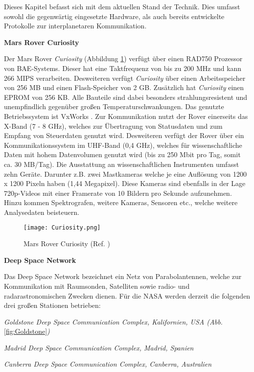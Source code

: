 \label{cap:standDerTechnik}
Dieses Kapitel befasst sich mit dem aktuellen Stand der Technik. Dies
umfasst sowohl die gegenw{\"a}rtig eingesetzte Hardware, als auch bereits
entwickelte Protokolle zur interplanetaren Kommunikation.


\textbf{Mars Rover Curiosity} 

Der Mars Rover \textit{Curiosity} (Abbildung \ref{fig:Curiosity}) verf{\"u}gt
{\"u}ber einen RAD750 Prozessor von BAE-Systems.
Dieser hat eine Taktfrequenz von bis zu 200 MHz und kann 266 MIPS
verarbeiten. Desweiteren verf{\"u}gt \textit{Curiosity} {\"u}ber einen
Arbeitsspeicher von 256 MB und einen Flash-Speicher von 2 GB. Zus{\"a}tzlich hat
\textit{Curiosity} einen EPROM von 256 KB. Alle Bauteile sind dabei besonders
strahlungsresistent und unempfindlich gegen{\"u}ber gro{\ss}en
Temperaturschwankungen. Das genutzte Betriebssystem ist VxWorks .
Zur Kommunikation nutzt der Rover einerseits das X-Band (7 - 8 GHz), welches zur
{\"U}bertragung von Statusdaten und zum Empfang von Steuerdaten genutzt wird.
Desweiteren verf{\"u}gt der Rover {\"u}ber ein Kommunikationssystem im UHF-Band
(0,4 GHz), welches f{\"u}r wissenschaftliche Daten mit hohem Datenvolumen
genutzt wird (bis zu 250 Mbit pro Tag, somit ca. 30 MB/Tag). Die Ausstattung an
wissenschaftlichen Instrumenten umfasst zehn Ger{\"a}te. Darunter z.B. zwei
Mastkameras welche je eine Aufl{\"o}sung von 1200 x 1200 Pixeln haben (1,44
Megapixel). Diese Kameras sind ebenfalls in der Lage 720p-Videos mit einer
Framerate von 10 Bildern pro Sekunde aufzunehmen. Hinzu kommen Spektrografen,
weitere Kameras, Sensoren etc., welche weitere Analysedaten beisteuern. 

\begin{figure}[H]
\centering
\texttt{[image: Curiosity.png]}
\caption{Mars Rover Curiosity (Ref. \cite{imgCuriosity})}
\label{fig:Curiosity}
\end{figure}

\textbf{Deep Space Network}

Das Deep Space Network bezeichnet ein Netz von Parabolantennen, welche zur
Kommunikation mit Raumsonden, Satelliten sowie radio-
und radarastronomischen Zwecken dienen. F{\"u}r die NASA werden derzeit die
folgenden drei gro{\ss}en Stationen betrieben:

\begin{compactenum}[a)]
\item \textit{Goldstone Deep Space Communication Complex, Kalifornien, USA
(Abb.} \ref{fig:Goldstone}\textit{)}
\item \textit{Madrid Deep Space Communication Complex, Madrid, Spanien}
\item \textit{Canberra Deep Space Communication Complex, Canberra, Australien}
\end{compactenum}

